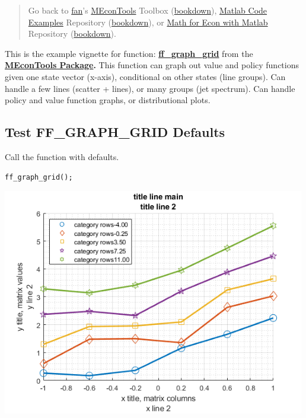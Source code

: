 \documentclass[
]{book}
\begin{document}
\begin{quote}
Go back to \href{http://fanwangecon.github.io/}{fan}'s \href{https://fanwangecon.github.io/MEconTools/}{MEconTools} Toolbox (\href{https://fanwangecon.github.io/MEconTools/bookdown}{bookdown}), \href{https://fanwangecon.github.io/M4Econ/}{Matlab Code Examples} Repository (\href{https://fanwangecon.github.io/M4Econ/bookdown}{bookdown}), or \href{https://fanwangecon.github.io/Math4Econ/}{Math for Econ with Matlab} Repository (\href{https://fanwangecon.github.io/Math4Econ/bookdown}{bookdown}).
\end{quote}

This is the example vignette for function:
\href{https://github.com/FanWangEcon/MEconTools/blob/master/MEconTools/graph/ff_graph_grid.m}{\textbf{ff\_graph\_grid}}
from the \href{https://fanwangecon.github.io/MEconTools/}{\textbf{MEconTools
Package}}\textbf{.} This function
can graph out value and policy functions given one state vector
(x-axis), conditional on other states (line groups). Can handle a few
lines (scatter + lines), or many groups (jet spectrum). Can handle
policy and value function graphs, or distributional plots.

\hypertarget{test-ff_graph_grid-defaults}{%
\subsection{Test FF\_GRAPH\_GRID Defaults}\label{test-ff_graph_grid-defaults}}

Call the function with defaults.

\begin{verbatim}
ff_graph_grid();
\end{verbatim}

\includegraphics[width=5.20833in,height=\textheight]{img/fx_graph_grid_images/figure_0.png}
\end{document}
